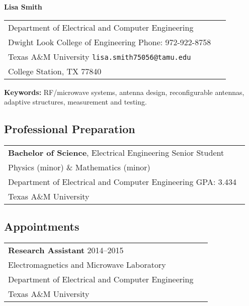 \newpage

\begin{center}
{\bfseries \Large Lisa Smith}
\end{center}

\begin{center}
\begin{tabular}{p{0.95\linewidth}}
Department of Electrical and Computer Engineering \\
Dwight Look College of Engineering
\hfill Phone: 972-922-8758 \\
Texas A\&M University
\hfill \texttt{lisa.smith75056@tamu.edu} \\
College Station, TX 77840
\end{tabular}
\end{center}

\textbf{Keywords:} RF/microwave systems, antenna design, reconfigurable antennas, adaptive structures, measurement and testing.

\subsection*{Professional Preparation}

\begin{center}
\begin{tabular}{p{0.95\linewidth}}
\textbf{Bachelor of Science}, Electrical Engineering \hfill Senior Student \\
Physics (minor) \& Mathematics (minor) \\
Department of Electrical and Computer Engineering \hfill GPA: 3.434 \\
Texas A\&M University
\end{tabular}
\end{center}

\subsection*{Appointments}

\begin{center}
\begin{tabular}{p{0.95\linewidth}}
\textbf{Research Assistant} \hfill 2014--2015 \\
Electromagnetics and Microwave Laboratory \\
Department of Electrical and Computer Engineering \\
Texas A\&M University
\end{tabular}
\end{center}

